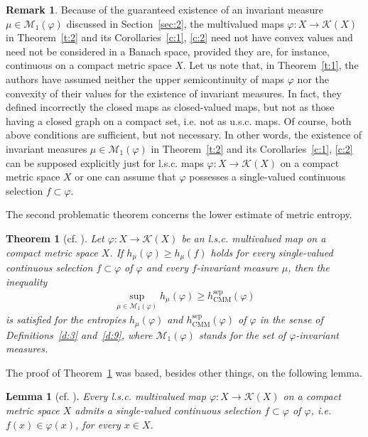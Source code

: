 \documentclass[12pt]{amsart}
\newtheorem{thm}{Theorem}
\newtheorem{lemma}{Lemma}
\theoremstyle{definition}
\newtheorem{remark}{Remark}
\newcommand{\M}{{\mathcal{M}}}
\newcommand{\KK}{\mathcal K}
\newcommand{\vp}{\varphi}
\newcommand{\sepp}{\operatorname{sep}}
\newcommand{\CM}{\operatorname{CMM}}
\newcommand{\hCM}{h_{\CM}}
\begin{document}
\begin{remark}\label{r:4}
Because of the guaranteed existence of an invariant measure $\mu\in\M_1(\vp)$ discussed in Section~\ref{sec:2}, the multivalued maps $\vp:X\to\KK(X)$ in Theorem~\ref{t:2} and its Corollaries~\ref{c:1}, \ref{c:2} need not have convex values and need not be considered in a Banach space, provided they are, for instance, continuous on a compact metric space $X$. Let us note that, in Theorem~\ref{t:1}, the authors have assumed neither the upper semicontinuity of maps $\vp$ nor the convexity of their values for the existence of invariant measures. In fact, they defined incorrectly the closed maps as closed-valued maps, but not as those having a closed graph on a compact set, i.e. not as u.s.c. maps. Of course, both above conditions are sufficient, but not necessary. In other words, the existence of invariant measures $\mu\in\M_1(\vp)$ in Theorem~\ref{t:2} and its Corollaries~\ref{c:1}, \ref{c:2} can be supposed explicitly just for l.s.c. maps $\vp:X\to\KK(X)$ on a compact metric space $X$ or one can assume that $\vp$ possesses a single-valued continuous selection $f\subset\vp$.
\end{remark}

The second problematic theorem concerns the lower estimate of metric entropy.

\begin{thm}[cf. {\cite[Theorem 3.7]{VS}}]\label{t:3}
Let $\vp:X\to\KK(X)$ be an l.s.c. multivalued map on a compact metric space $X$. If $h_\mu(\vp)\geq h_\mu(f)$ holds for every single-valued continuous selection $f\subset\vp$ of $\vp$ and every $f$-invariant measure $\mu$, then the inequality
\begin{align}\label{eq:A11}
\sup_{\mu\in\M_1(\vp)} h_\mu(\vp) \geq \hCM^{\sepp}(\vp)
\end{align}
is satisfied for the entropies $h_\mu(\vp)$ and $\hCM^{\sepp}(\vp)$ of $\vp$ in the sense of Definitions~\ref{d:3} and~\ref{d:9}, where $\M_1(\vp)$ stands for the set of $\vp$-invariant measures.
\end{thm}

The proof of Theorem~\ref{t:3} was based, besides other things, on the following lemma.

\begin{lemma}[cf. {\cite[Lemma 3.6]{VS}}]\label{l:7}
Every l.s.c. multivalued map $\vp:X\to\KK(X)$ on a compact metric space $X$ admits a single-valued continuous selection $f\subset\vp$ of $\vp$, i.e. $f(x)\in\vp(x)$, for every $x\in X$.
\end{lemma}
\end{document}
